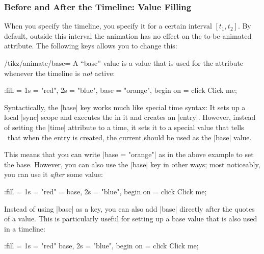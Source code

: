 \subsubsection{Before and After the Timeline: Value Filling}

When you specify the timeline, you specify it for a certain interval
$[t_1,t_2]$. By default, outside this interval the animation has no effect on
the to-be-animated attribute. The following keys allows you to change this:

\begin{key}{/tikz/animate/base=}
    A ``base'' value is a value that is used for the attribute whenever the
    timeline is \emph{not} active:
\begin{codeexample}[
    preamble={\usetikzlibrary{animations}},
    animation list = {0.5,1,1.5,2,2.5},
]
\tikz \node [fill = green, text = white] :fill =
    { 1s = "red", 2s = "blue", base = "orange", begin on = click }
  {Click me};
\end{codeexample}

    Syntactically, the |base| key works much like special time syntax: It sets
    up a local |sync| scope and executes the  in it and creates
    an |entry|. However, instead of setting the |time| attribute to a time, it
    sets it to a special value that tells \tikzname\ that when the entry is
    created, the current  should be used as the |base| value.

    This means that you can write |base = "orange"| as in the above example to
    set the base. However, you can also use the |base| key in other ways; most
    noticeably, you can use it \emph{after} some value:
\begin{codeexample}[
    preamble={\usetikzlibrary{animations}},
    animation list = {0.5,1,1.5,2,2.5},
]
\tikz \node [fill = green, text = white] :fill =
    { 1s = {"red" = base}, 2s = "blue", begin on = click }
  {Click me};
\end{codeexample}

    Instead of using |base| as a key, you can also add |base| directly after
    the quotes of a value. This is particularly useful for setting up a base
    value that is also used in a timeline:
\begin{codeexample}[
    preamble={\usetikzlibrary{animations}},
    animation list = {0.5,1,1.5,2,2.5},
]
\tikz \node [fill = green, text = white] :fill =
    { 1s = "red" base, 2s = "blue", begin on = click }
  {Click me};
\end{codeexample}
\end{key}

